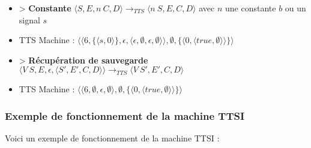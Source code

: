 \documentclass[10pt,a4paper]{article}
\begin{document}
\begin{itemize}
					\item[] > \textbf{Constante} $\langle S,E,n~C,D\rangle 
					\longrightarrow_{TTS} 
					\langle n~S,E,C,D\rangle$ avec $n$ une constante $b$ ou un signal $s$
					\item[] TTS Machine : $\langle \langle 6,\{\langle s,0\rangle\},\epsilon,\langle \epsilon,\emptyset,\epsilon,\emptyset\rangle\rangle,\emptyset,\{\langle 0,\langle true,\emptyset\rangle\rangle\}\rangle$
					\item[] > \textbf{Récupération de sauvegarde} $\langle V~S,E,\epsilon,\langle S',E',C,D\rangle\rangle
					\longrightarrow_{TTS} 
					\langle V~S',E',C,D\rangle$
					\item[] TTS Machine : $\langle \langle 6,\emptyset,\epsilon,\emptyset\rangle,\emptyset,\{\langle 0,\langle true,\emptyset\rangle\rangle\}\rangle$
				\end{itemize}
				\newpage
				
			\subsubsection{Exemple de fonctionnement de la machine TTSI}\label{TTSI}
			
				Voici un exemple de fonctionnement de la machine TTSI :
				
\end{document}
